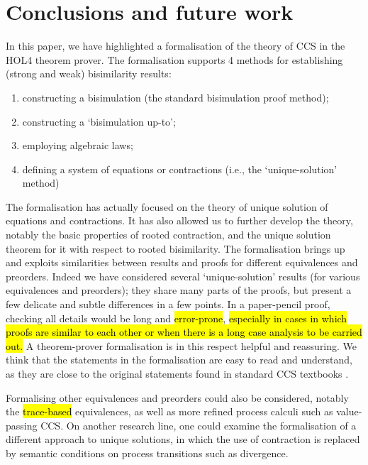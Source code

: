 
\section{Conclusions and future work}
\label{s:concl}

In this paper, we have highlighted a formalisation of the theory of CCS in the 
HOL4 theorem prover.
The formalisation supports 4 methods for establishing (strong and weak) bisimilarity
results: 
\begin{enumerate}
\item
 constructing a bisimulation (the standard bisimulation proof
method);
\item constructing a `bisimulation up-to'; 
\item employing algebraic laws;
\item defining a system of equations or contractions
(i.e., the `unique-solution' method)
\end{enumerate}

The formalisation has actually focused on the theory of
unique solution of equations and contractions. It    
 has also allowed us to further develop the theory,
notably the basic properties of rooted contraction, and the unique
solution theorem for it with respect to rooted bisimilarity. 
The formalisation brings up and exploits similarities between results
and proofs for different equivalences and preorders. Indeed we have
considered several `unique-solution' results (for various equivalences
and preorders); they share many parts of the proofs, but present a few
delicate and subtle differences in a few points. In a paper-pencil
proof, checking all details would be long and \hl{error-prone},
\hl{especially in cases in which proofs are similar to each other or
  when there is a long case analysis to be carried out.}
A theorem-prover formalisation is in this respect  helpful and reassuring.
We think that the statements in the formalisation are easy to read and
understand, as they are  close to the original statements found in
standard CCS textbooks \cite{Gorrieri:2015jt,Mil89}.

Formalising other equivalences and preorders could also be considered,
notably the \hl{trace-based} equivalences, as well as more refined process
calculi such as value-passing CCS.
%
On another research line, one could examine the formalisation of a different
approach \cite{DurierHS17} to unique
solutions, in which the use of contraction is
replaced by semantic conditions on process transitions such as
divergence. 


